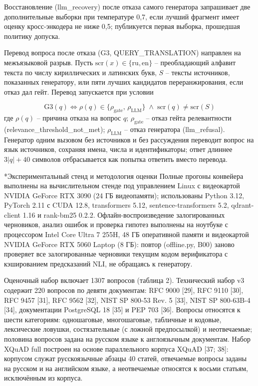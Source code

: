 \documentclass[14pt,a4paper]{extarticle}
\makeatletter
\renewcommand\subsection{\@startsection{subsection}{2}{\z@}{8pt plus 2pt}{4pt}{\normalfont\normalsize\bfseries\itshape\raggedright}}
\makeatother
\begin{document}
Восстановление (llm\_recovery) после отказа самого генератора запрашивает две дополнительные выборки при температуре 0,7, если лучший фрагмент имеет оценку кросс-энкодера не ниже 0,5; публикуется первая выборка, прошедшая политику допуска.

Перевод вопроса после отказа (G3, QUERY\_TRANSLATION) направлен на межъязыковой разрыв. Пусть $\mathrm{scr}(x) \in \{\mathrm{ru}, \mathrm{en}\}$ – преобладающий алфавит текста по числу кириллических и латинских букв, $S$ – тексты источников, показанных генератору, или пяти лучших кандидатов переранжирования, если отказ дал гейт. Перевод запускается при условии

\begin{equation}
\mathrm{G3}(q) \iff \rho(q) \in \{\rho_{\mathrm{gate}},\, \rho_{\mathrm{LLM}}\} \;\wedge\; \mathrm{scr}(q) \ne \mathrm{scr}(S)
\tag{10}
\end{equation}
\noindent где $\rho(q)$ – причина отказа на вопрос $q$; $\rho_{\mathrm{gate}}$ – отказ гейта релевантности (relevance\_threshold\_not\_met); $\rho_{\mathrm{LLM}}$ – отказ генератора (llm\_refusal). Генератор одним вызовом без источников и без рассуждения переводит вопрос на язык источников, сохраняя имена, числа и идентификаторы; ответ длиннее $3|q| + 40$ символов отбрасывается как попытка ответить вместо перевода.

\subsection*{Экспериментальный стенд и методология оценки}
Полные прогоны конвейера выполнены на вычислительном стенде под управлением Linux с видеокартой NVIDIA GeForce RTX 3090 (24 ГБ видеопамяти); использованы Python 3.12, PyTorch 2.11 с CUDA 12.8, transformers 5.12, sentence-transformers 5.2, qdrant-client 1.16 и rank-bm25 0.2.2. Офлайн-воспроизведение залогированных черновиков, анализ ошибок и проверка гипотез выполнены на ноутбуке с процессором Intel Core Ultra 7 255H, 48 ГБ оперативной памяти и видеокартой NVIDIA GeForce RTX 5060 Laptop (8 ГБ): повтор (offline.py, B00) заново проверяет все залогированные черновики текущим кодом верификатора с кэшированием предсказаний NLI, не обращаясь к генератору.

Оценочный набор включает 1307 вопросов (таблица 2). Технический набор v3 содержит 220 вопросов по девяти документам: RFC 9000 [29], RFC 9110 [30], RFC 9457 [31], RFC 9562 [32], NIST SP 800-53 Rev. 5 [33], NIST SP 800-63B-4 [34], документации PostgreSQL 18 [35] и PEP 703 [36]. Вопросы относятся к шести категориям: одношаговые, многошаговые, табличные и кодовые, лексические ловушки, состязательные (с ложной предпосылкой) и неотвечаемые; половина вопросов задана на русском языке к англоязычным документам. Набор XQuAD full построен на основе параллельного корпуса XQuAD [37; 38]: корпусом служат русскоязычные абзацы 40 статей, отвечаемые вопросы заданы на русском и на английском языке, а неотвечаемые относятся к восьми статьям, исключённым из корпуса.
\end{document}
